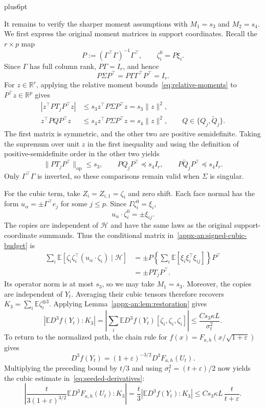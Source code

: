 \documentclass[11pt,letterpaper,twoside,leqno]{article}
\makeatletter
\theoremstyle{bookplain}
\theoremstyle{bookremark}
\renewenvironment{proof}[1][\proofname]{\par
  \pushQED{\qed}\normalfont\topsep6pt plus6pt\relax
  \trivlist\item[\hskip\labelsep\bfseries #1\@addpunct{.}]\ignorespaces
}{\popQED\endtrivlist\@endpefalse}
\newcommand{\E}{\mathbb E}
\newcommand{\R}{\mathbb R}
\newcommand{\op}{\mathrm{op}}
\makeatother
\begin{document}
\begin{proof}[Proof of the seeded estimates~\eqref{eq:seeded-derivatives}]
It remains to verify the sharper moment assumptions with
$M_1=s_3$ and $M_2=s_4$. We first express the original moment
matrices in support coordinates. Recall the $r\times p$ map
\[
 P:=(\Gamma^\top\Gamma)^{-1}\Gamma^\top,
 \qquad \zeta_i^0=P\xi_i.
\]
Since $\Gamma$ has full column rank, $P\Gamma=I_r$, and hence
\[
 P\Sigma P^\top=P\Gamma\Gamma^\top P^\top=I_r.
\]
For $z\in\R^r$, applying the relative moment
bounds~\eqref{eq:relative-moments} to $P^\top z\in\R^p$ gives
\[
 \begin{aligned}
 |z^\top PT_jP^\top z|
 &\le s_3z^\top P\Sigma P^\top z=s_3\|z\|^2,\\
 z^\top PQP^\top z
 &\le s_4z^\top P\Sigma P^\top z=s_4\|z\|^2,
       \qquad Q\in\{Q_j,\widetilde Q_j\}.
 \end{aligned}
\]
The first matrix is symmetric, and the other two are positive
semidefinite. Taking the supremum over unit $z$ in the first
inequality and using the definition of positive-semidefinite
order in the other two yields
\[
 \|PT_jP^\top\|_{\op}\le s_3,\qquad
 PQ_jP^\top\preceq s_4I_r,\qquad
 P\widetilde Q_jP^\top\preceq s_4I_r.
\]
Only $\Gamma^\top\Gamma$ is inverted, so these comparisons
remain valid when $\Sigma$ is singular.

For the cubic term, take $Z_i=Z_{i,1}=\zeta_i$ and zero shift.
Each face normal has the form $u_\alpha=\pm\Gamma^\top e_j$
for some $j\le p$. Since $\Gamma\zeta_i^0=\xi_i$,
\[
 u_\alpha\cdot\zeta_i^0=\pm\xi_{ij}.
\]
The copies are independent of $\mathcal H$ and have the same
laws as the original support-coordinate summands. Thus the
conditional matrix in~\eqref{appx-an:signed-cubic-budget} is
\[
 \begin{aligned}
 \sum_i\E[\zeta_i\zeta_i^\top
                    (u_\alpha\cdot\zeta_i)\mid\mathcal H]
 &=\pm P\left\{\sum_i\E[\xi_i\xi_i^\top\xi_{ij}]\right\}P^\top\\
 &=\pm PT_jP^\top.
 \end{aligned}
\]
Its operator norm is at most $s_3$, so we may take $M_1=s_3$.
Moreover, the copies are independent of $Y_t$. Averaging their
cubic tensors therefore recovers
$K_3=\sum_i\E\zeta_i^{\otimes3}$. Applying
Lemma~\ref{appx-an:lem:restoration} gives
\[
 |\E D^3f(Y_t):K_3|
 =\left|\sum_i\E D^3f(Y_t)[\zeta_i,\zeta_i,\zeta_i]\right|
 \le\frac{Cs_3\kappa L}{\sigma_t^2}.
\]
To return to the normalized path, the chain rule for
$f(x)=F_{a,h}(x/\sqrt{1+\varepsilon})$ gives
\[
 D^3f(Y_t)=(1+\varepsilon)^{-3/2}D^3F_{a,h}(U_t).
\]
Multiplying the preceding bound by $t/3$ and using
$\sigma_t^2=(t+\varepsilon)/2$ now yields the cubic estimate
in~\eqref{eq:seeded-derivatives}:
\[
 \left|\frac{t}{3(1+\varepsilon)^{3/2}}
        \E D^3F_{a,h}(U_t):K_3\right|
 =\frac t3|\E D^3f(Y_t):K_3|
 \le Cs_3\kappa L\,\frac{t}{t+\varepsilon}.
\]


\end{proof}
\end{document}
